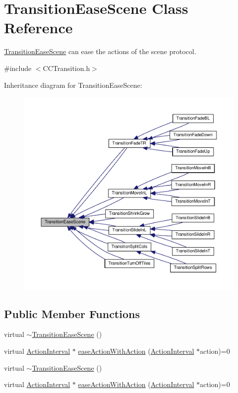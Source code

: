 \hypertarget{classTransitionEaseScene}{}\section{Transition\+Ease\+Scene Class Reference}
\label{classTransitionEaseScene}


\hyperlink{classTransitionEaseScene}{Transition\+Ease\+Scene} can ease the actions of the scene protocol.  




{\ttfamily \#include $<$C\+C\+Transition.\+h$>$}



Inheritance diagram for Transition\+Ease\+Scene\+:
\nopagebreak
\begin{figure}[H]
\begin{center}
\leavevmode
\includegraphics[width=350pt]{classTransitionEaseScene__inherit__graph}
\end{center}
\end{figure}
\subsection*{Public Member Functions}
\begin{DoxyCompactItemize}
\item 
virtual \hyperlink{classTransitionEaseScene_a38cdd19ad5536c133ced78b117b902b2}{$\sim$\+Transition\+Ease\+Scene} ()
\item 
virtual \hyperlink{classActionInterval}{Action\+Interval} $\ast$ \hyperlink{classTransitionEaseScene_a6f27540600b0d703ed30adc8976e65df}{ease\+Action\+With\+Action} (\hyperlink{classActionInterval}{Action\+Interval} $\ast$action)=0
\item 
virtual \hyperlink{classTransitionEaseScene_a38cdd19ad5536c133ced78b117b902b2}{$\sim$\+Transition\+Ease\+Scene} ()
\item 
virtual \hyperlink{classActionInterval}{Action\+Interval} $\ast$ \hyperlink{classTransitionEaseScene_a6f27540600b0d703ed30adc8976e65df}{ease\+Action\+With\+Action} (\hyperlink{classActionInterval}{Action\+Interval} $\ast$action)=0
\end{DoxyCompactItemize}


